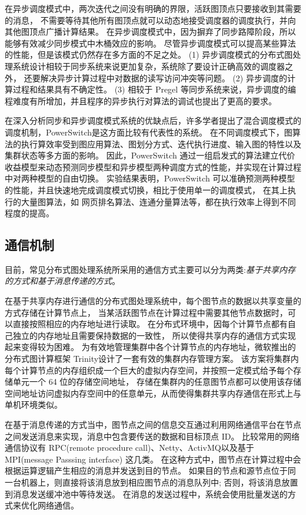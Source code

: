 在异步调度模式中，两次迭代之间没有明确的界限，活跃图顶点只要接收到其需要的消息，
不需要等待其他所有图顶点就可以动态地接受调度器的调度执行，并向其他图顶点广播计算结果。
在异步调度模式中，因为摒弃了同步路障阶段，所以能够有效减少同步模式中木桶效应的影响。
尽管异步调度模式可以提高某些算法的性能，但是该模式仍然存在多方面的不足之处。
(1) 异步调度模式的分布式图处理系统设计相较于同步系统来说更加复杂，系统除了要设计正确高效的调度器之外，
还要解决异步计算过程中对数据的读写访问冲突等问题。
(2) 异步调度的计算过程和结果具有不确定性。
(3) 相较于 Pregel 等同步系统来说，异步调度的编程难度有所增加，并且程序的异步执行对算法的调试也提出了更高的要求。

在深入分析同步和异步调度模式系统的优缺点后，许多学者提出了混合调度模式的调度机制，PowerSwitch\cite{Xie@PPoPP15}是这方面比较有代表性的系统。
在不同调度模式下，图算法的执行算效率受到图应用算法、图划分方式、迭代执行进度、输入图的特性以及集群状态等多方面的影响。
因此，PowerSwitch 通过一组启发式的算法建立代价收益模型来动态预测同步模型和异步模型两种调度方式的性能，并实现在计算过程中对两种模型的自由切换。
实验结果表明，PowerSwitch 可以准确预测两种模型的性能，并且快速地完成调度模式切换，相比于使用单一的调度模式，
在其上执行的大量图算法，如 网页排名算法、连通分量算法等，都在执行效率上得到不同程度的提高。

\subsection{通信机制}

目前，常见分布式图处理系统所采用的通信方式主要可以分为两类:\textit{基于共享内存的方式和基于消息传递的方式}。
        
在基于共享内存进行通信的分布式图处理系统中，每个图节点的数据以共享变量的方式存储在计算节点上，
当某活跃图节点在计算过程中需要其他节点数据时，可以直接按照相应的内存地址进行读取。
在分布式环境中，因每个计算节点都有自己独立的内存地址且需要保持数据的一致性，
所以使得共享内存的通信方式实现起来变得较为困难。
为有效地管理集群中各个计算节点的内存地址，微软推出的分布式图计算框架 Trinity\cite{Shao@SIGMOD13}设计了一套有效的集群内存管理方案。
该方案将集群内每个计算节点的内存组织成一个巨大的虚拟内存空间，并按照一定模式给予每个存储单元一个 64 位的存储空间地址，
存储在集群内的任意图节点都可以使用该存储空间地址访问虚拟内存空间中的任意单元，从而使得集群共享内存通信在形式上与单机环境类似。

在基于消息传递的方式当中，图节点之间的信息交互通过利用网络通信平台在节点之间发送消息来实现，消息中包含要传送的数据和目标顶点 ID。
比较常用的网络通信协议有
RPC(remote procedure call)\cite{rpc}、Netty\cite{netty}、ActivMQ\cite{activemq}以及基于 MPI(message Passsing interface)\cite{mpi}
这几类。
在这种方式中，图节点在计算过程中会根据运算逻辑产生相应的消息并发送到目的节点。
如果目的节点和源节点位于同一台机器上，则直接将该消息放到相应图节点的消息队列中;
否则，将该消息放置到消息发送缓冲池中等待发送。
在消息的发送过程中，系统会使用批量发送的方式来优化网络通信。

